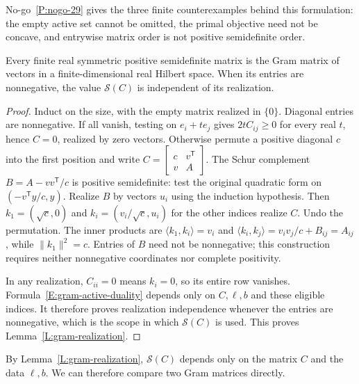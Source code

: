 No-go~\ref{P:nogo-29} gives the three finite counterexamples behind this
formulation: the empty active set cannot be omitted, the primal objective
need not be concave, and entrywise matrix order is not positive
semidefinite order.






\begin{lemma}\label{L:gram-realization}
  Every finite real symmetric positive semidefinite matrix is the Gram matrix of
  vectors in a finite-dimensional real Hilbert space. When its entries are
  nonnegative, the value $\mathscr{S}(C)$ is independent of its realization.
\end{lemma}

\begin{proof}
  Induct on the size, with the empty matrix realized in $\{0\}$. Diagonal
  entries are nonnegative. If all vanish, testing on $e_i+t e_j$ gives $2tC_{ij}
  \ge 0$ for every real $t$, hence $C = 0$, realized by zero vectors. Otherwise
  permute a positive diagonal $c$ into the first position and write $C =
  \left[\begin{smallmatrix}c&v^{\mathsf{T}}\\v&A\end{smallmatrix}\right]$. The
  Schur complement $B = A-vv^{\mathsf{T}}/c$ is positive semidefinite: test the
  original quadratic form on $(-v^{\mathsf{T}}y/c,y)$. Realize $B$ by vectors
  $u_i$ using the induction hypothesis. Then $k_1 = (\sqrt c,0)$ and $k_i =
  (v_i/\sqrt c,u_i)$ for the other indices realize $C$. Undo the permutation.
  The inner products are $\langle k_1,k_i\rangle=v_i$ and $\langle
  k_i,k_j\rangle=v_iv_j/c+B_{ij}=A_{ij}$, while $\|k_1\|^2=c$.
  Entries of $B$ need not be nonnegative; this construction requires neither
  nonnegative coordinates nor complete positivity.

  In any realization, $C_{ii} = 0$ means $k_i = 0$, so its entire row vanishes.
  Formula~\eqref{E:gram-active-duality} depends only on $C,\ell,b$ and these
  eligible indices. It therefore proves realization independence whenever the
  entries are nonnegative, which is the scope in which $\mathscr{S}(C)$ is used.
  This proves Lemma~\ref{L:gram-realization}.
\end{proof}

By Lemma~\ref{L:gram-realization}, $\mathscr{S}(C)$ depends only on the matrix
$C$ and the data $\ell,b$. We can therefore compare two Gram matrices directly.

